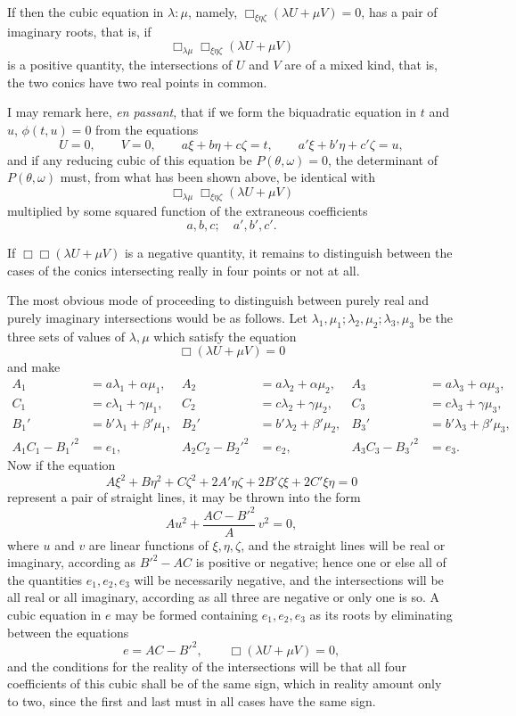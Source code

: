 \documentclass[11pt]{article}
\newcommand{\sourcepage}[1]{\marginpar{\scriptsize p.~#1}}
\begin{document}
{{If then the cubic equation in $\lambda:\mu$, namely, $\Box_{\xi\eta\zeta}(\lambda U+\mu V)=0$, has a pair of imaginary roots, that is, if
\[
\Box_{\lambda\mu}\Box_{\xi\eta\zeta}(\lambda U+\mu V)
\]
is a positive quantity, the intersections of $U$ and $V$ are of a mixed kind, that is, the two conics have two real points in common.

\sourcepage{121}
I may remark here, \emph{en passant}, that if we form the biquadratic equation in $t$ and $u$, $\phi(t,u)=0$ from the equations
\[
U=0,\qquad V=0,\qquad
a\xi+b\eta+c\zeta=t,\qquad
a'\xi+b'\eta+c'\zeta=u,
\]
and if any reducing cubic of this equation be $P(\theta,\omega)=0$, the determinant of $P(\theta,\omega)$ must, from what has been shown above, be identical with
\[
\Box_{\lambda\mu}\Box_{\xi\eta\zeta}(\lambda U+\mu V)
\]
multiplied by some squared function of the extraneous coefficients
\[
a,b,c;\quad a',b',c'.
\]

If $\Box\Box(\lambda U+\mu V)$ is a negative quantity, it remains to distinguish between the cases of the conics intersecting really in four points or not at all.

The most obvious mode of proceeding to distinguish between purely real and purely imaginary intersections would be as follows. Let $\lambda_1,\mu_1;\lambda_2,\mu_2;\lambda_3,\mu_3$ be the three sets of values of $\lambda,\mu$ which satisfy the equation
\[
\Box(\lambda U+\mu V)=0
\]
and make
\[
\begin{aligned}
A_1&=a\lambda_1+\alpha\mu_1,&
A_2&=a\lambda_2+\alpha\mu_2,&
A_3&=a\lambda_3+\alpha\mu_3,\\
C_1&=c\lambda_1+\gamma\mu_1,&
C_2&=c\lambda_2+\gamma\mu_2,&
C_3&=c\lambda_3+\gamma\mu_3,\\
B_1'&=b'\lambda_1+\beta'\mu_1,&
B_2'&=b'\lambda_2+\beta'\mu_2,&
B_3'&=b'\lambda_3+\beta'\mu_3,\\
A_1C_1-B_1'^2&=e_1,&
A_2C_2-B_2'^2&=e_2,&
A_3C_3-B_3'^2&=e_3.
\end{aligned}
\]
Now if the equation
\[
A\xi^2+B\eta^2+C\zeta^2+2A'\eta\zeta+2B'\zeta\xi+2C'\xi\eta=0
\]
represent a pair of straight lines, it may be thrown into the form
\[
Au^2+\frac{AC-B'^2}{A}\,v^2=0,
\]
where $u$ and $v$ are linear functions of $\xi,\eta,\zeta$, and the straight lines will be real or imaginary, according as $B'^2-AC$ is positive or negative; hence one or else all of the quantities $e_1,e_2,e_3$ will be necessarily negative, and the intersections will be all real or all imaginary, according as all three are negative or only one is so. A cubic equation in $e$ may be formed containing $e_1,e_2,e_3$ as its roots by eliminating between the equations
\[
e=AC-B'^2,\qquad \Box(\lambda U+\mu V)=0,
\]
and the conditions for the reality of the intersections will be that all four coefficients of this cubic shall be of the same sign, which in reality amount only to two, since the first and last must in all cases have the same sign.

}}
\end{document}
